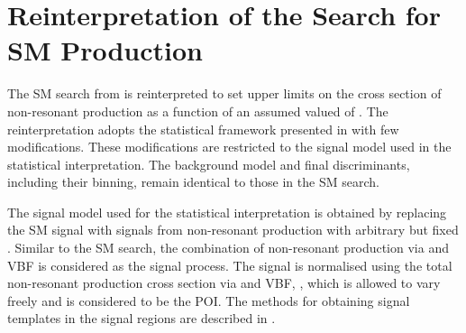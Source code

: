 \section{Reinterpretation of the Search for SM \HH Production}%
\label{sec:reinterpretation}

The SM \HH search from  is reinterpreted to set
upper limits on the cross section of non-resonant \HH production as a
function of an assumed valued of \klambda. %
The reinterpretation adopts the statistical framework presented in
 with few modifications. These
modifications are restricted to the signal model used in the
statistical interpretation. The background model and final
discriminants, including their binning, remain identical to those in
the SM \HH search.

The signal model used for the statistical interpretation is obtained by
replacing the SM \HH signal with signals from non-resonant \HH production with
arbitrary but fixed \klambda. Similar to the SM \HH search, the combination of
non-resonant \HH production via \ggF and VBF is considered as the signal
process. The signal is normalised using the total non-resonant \HH production
cross section via \ggF and VBF, \xsecggfvbf, which is allowed to vary freely and
is considered to be the POI.
The methods for obtaining signal templates in the signal regions are
described in .

